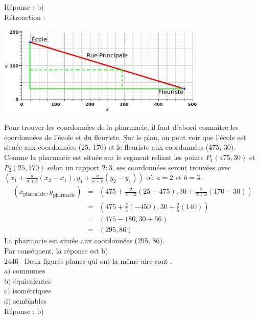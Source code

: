 \documentclass[letterpaper, 12pt]{article}
\begin{document}
R\'eponse : b$)$\\

R\'etroaction :\\
\begin{center}
 \includegraphics[width=10cm,bb=14 14 815 362]{Q2445r.eps}
\end{center}
Pour trouver les coordonn\'ees de la pharmacie, il faut d'abord conna\^itre les coordonn\'ees de l'\'ecole et du fleuriste. Sur le plan, on peut voir que l'\'ecole est situ\'ee aux coordonn\'ees (25, 170) et le fleuriste aux coordonn\'ees (475, 30). Comme la pharmacie est situ\'ee sur le segment reliant les points $P_{1}(475, 30)$ et $P_{2}(25, 170)$ selon un rapport $2:3$, ses coordonn\'ees seront trouv\'ees avec $\left( x_{1}+\frac{a}{a+b}(x_{2}-x_{1}), y_{1}+\frac{a}{a+b}(y_{2}-y_{1})\right) $ o\`u $a=2$ et $b=3$.
\begin{eqnarray*}
 (x_{\textrm{pharmacie}},y_{\textrm{pharmacie}})&=&\left( 475+\frac{2}{2+3}(25-475), 30+\frac{2}{2+3}(170-30)\right) \\[2mm]
&=&\left( 475+\frac{2}{5}(-450), 30+\frac{2}{5}(140)\right) \\[2mm]
&=&\left( 475-180, 30+56\right) \\[2mm]
&=&\left( 295, 86\right)
\end{eqnarray*}
La pharmacie est situ\'ee aux coordonn\'ees (295, 86).\\
Par cons\'equent, la r\'eponse est b).\\


2446-- Deux figures planes qui ont la m\^eme aire sont \underline{\qquad\qquad}.\\

a$)$ communes\\
b$)$ \'equivalentes\\
c$)$ isom\'etriques\\
d$)$ semblables\\


R\'eponse : b)\\
\end{document}
